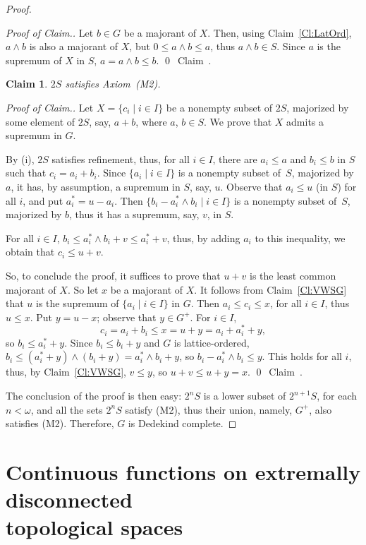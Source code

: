 \documentclass[psamsfonts,reqno]{memo-l}
\theoremstyle{plain}
\newtheorem{claim}{Claim}
\theoremstyle{definition}
\theoremstyle{remark}
\newcommand{\qedc}{{\qed}~{\rm Claim~{\theclaim}.}}
\newenvironment{cproof}
{\begin{proof}[Proof of Claim.]}
{\qedc\renewcommand{\qed}{}\end{proof}}
\numberwithin{equation}{section}
\newcommand{\set}[1]{\{#1\}}
\newcommand{\setm}[2]{\set{#1\mid#2}}
\begin{document}
\begin{proof}
\begin{cproof}
Let $b\in G$ be a majorant of $X$. Then, using Claim~\ref{Cl:LatOrd},
$a\wedge b$ is also a majorant of $X$, but $0\leq a\wedge b\leq a$, thus
$a\wedge b\in S$. Since $a$ is the supremum of $X$ in $S$,
$a=a\wedge b\leq b$.
\end{cproof}

\begin{claim}
$2S$ satisfies Axiom~\textup{(M2)}.
\end{claim}

\begin{cproof}
Let $X=\setm{c_i}{i\in I}$ be a nonempty subset of $2S$, majorized by some
element of $2S$, say, $a+b$, where $a$, $b\in S$. We prove that $X$ admits a
supremum in $G$.

By (i), $2S$ satisfies
refinement, thus, for all $i\in I$, there are $a_i\leq a$ and $b_i\leq b$
in $S$ such that $c_i=a_i+b_i$. Since $\setm{a_i}{i\in I}$ is a nonempty
subset of~$S$, majorized by $a$, it has, by assumption, a supremum in $S$,
say, $u$. Observe that $a_i\leq u$ (in $S$) for all $i$, and put
$a_i^*=u-a_i$. Then $\setm{b_i-a_i^*\wedge b_i}{i\in I}$ is a nonempty subset
of~$S$, majorized by $b$, thus it has a supremum, say, $v$, in $S$.

For all $i\in I$, $b_i\leq a_i^*\wedge b_i+v\leq a_i^*+v$, thus, by adding
$a_i$ to this inequality, we obtain that $c_i\leq u+v$.

So, to conclude the proof, it suffices to prove that $u+v$ is the least
common majorant of $X$. So let $x$ be a majorant of $X$.
It follows from Claim~\ref{Cl:VWSG} that $u$ is the supremum
of $\setm{a_i}{i\in I}$ in $G$. Then $a_i\leq c_i\leq x$, for all $i\in I$,
thus $u\leq x$. Put $y=u-x$; observe that $y\in G^+$. For $i\in I$,
   \[
   c_i=a_i+b_i\leq x=u+y=a_i+a_i^*+y,
   \]
so $b_i\leq a_i^*+y$. Since $b_i\leq b_i+y$ and $G$ is lattice-ordered,
$b_i\leq(a_i^*+y)\wedge(b_i+y)=a_i^*\wedge b_i+y$, so
$b_i-a_i^*\wedge b_i\leq y$. This holds for all $i$, thus, by
Claim~\ref{Cl:VWSG}, $v\leq y$, so $u+v\leq u+y=x$.
\end{cproof}

The conclusion of the proof is then easy: $2^nS$ is a lower subset of
$2^{n+1}S$, for each $n<\omega$, and all the sets $2^nS$ satisfy (M2), thus
their union, namely, $G^+$, also satisfies (M2). Therefore, $G$ is Dedekind
complete.
\end{proof}

\section[Continuous functions]
{Continuous functions on extremally disconnected\\
topological spaces}\label{S:cmpBooleanspc}
\end{document}
